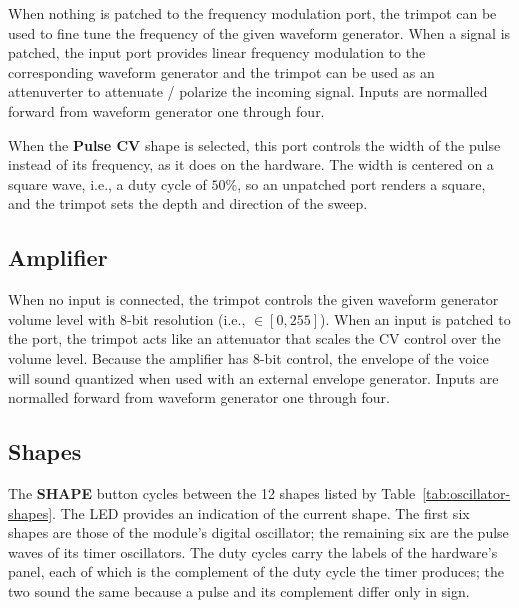 \documentclass[12pt,letter]{article}
\begin{document}
When nothing is patched to the frequency modulation port, the trimpot can be used to fine tune the frequency of the given waveform generator. When a signal is patched, the input port provides linear frequency modulation to the corresponding waveform generator and the trimpot can be used as an attenuverter to attenuate / polarize the incoming signal. Inputs are normalled forward from waveform generator one through four.

When the \textbf{Pulse CV} shape is selected, this port controls the width of the pulse instead of its frequency, as it does on the hardware. The width is centered on a square wave, i.e., a duty cycle of $50\%$, so an unpatched port renders a square, and the trimpot sets the depth and direction of the sweep.

\subsection{Amplifier}

When no input is connected, the trimpot controls the given waveform generator volume level with 8-bit resolution (i.e., $\in [0, 255]$). When an input is patched to the port, the trimpot acts like an attenuator that scales the CV control over the volume level. Because the amplifier has 8-bit control, the envelope of the voice will sound quantized when used with an external envelope generator. Inputs are normalled forward from waveform generator one through four.

\subsection{Shapes}

The \textbf{SHAPE} button cycles between the 12 shapes listed by Table~\ref{tab:oscillator-shapes}. The LED provides an indication of the current shape. The first six shapes are those of the module's digital oscillator; the remaining six are the pulse waves of its timer oscillators. The duty cycles carry the labels of the hardware's panel, each of which is the complement of the duty cycle the timer produces; the two sound the same because a pulse and its complement differ only in sign.
\end{document}
